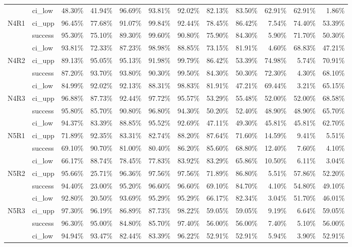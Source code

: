 \begin{tabular}{llrrrrrrrrrr}
     & ci\_low &      48.30\% & 41.94\% & 96.69\% & 93.81\% & 92.02\% &       82.13\% & 83.50\% & 62.91\% & 62.91\% &  1.86\% \\
N4R1 & ci\_upp &      96.45\% & 77.68\% & 91.07\% & 99.84\% & 92.44\% &       78.45\% & 86.42\% &  7.54\% & 74.40\% & 53.39\% \\
     & success &      95.30\% & 75.10\% & 89.30\% & 99.60\% & 90.80\% &       75.90\% & 84.30\% &  5.90\% & 71.70\% & 50.30\% \\
     & ci\_low &      93.81\% & 72.33\% & 87.23\% & 98.98\% & 88.85\% &       73.15\% & 81.91\% &  4.60\% & 68.83\% & 47.21\% \\
N4R2 & ci\_upp &      89.13\% & 95.05\% & 95.13\% & 91.98\% & 99.79\% &       86.42\% & 53.39\% & 74.98\% &  5.74\% & 70.91\% \\
     & success &      87.20\% & 93.70\% & 93.80\% & 90.30\% & 99.50\% &       84.30\% & 50.30\% & 72.30\% &  4.30\% & 68.10\% \\
     & ci\_low &      84.99\% & 92.02\% & 92.13\% & 88.31\% & 98.83\% &       81.91\% & 47.21\% & 69.44\% &  3.21\% & 65.15\% \\
N4R3 & ci\_upp &      96.88\% & 87.73\% & 92.44\% & 97.72\% & 95.57\% &       53.29\% & 55.48\% & 52.00\% & 52.00\% & 68.58\% \\
     & success &      95.80\% & 85.70\% & 90.80\% & 96.80\% & 94.30\% &       50.20\% & 52.40\% & 48.90\% & 48.90\% & 65.70\% \\
     & ci\_low &      94.37\% & 83.39\% & 88.85\% & 95.52\% & 92.69\% &       47.11\% & 49.30\% & 45.81\% & 45.81\% & 62.70\% \\
N5R1 & ci\_upp &      71.89\% & 92.35\% & 83.31\% & 82.74\% & 88.20\% &       87.64\% & 71.60\% & 14.59\% &  9.41\% &  5.51\% \\
     & success &      69.10\% & 90.70\% & 81.00\% & 80.40\% & 86.20\% &       85.60\% & 68.80\% & 12.40\% &  7.60\% &  4.10\% \\
     & ci\_low &      66.17\% & 88.74\% & 78.45\% & 77.83\% & 83.92\% &       83.29\% & 65.86\% & 10.50\% &  6.11\% &  3.04\% \\
N5R2 & ci\_upp &      95.66\% & 25.71\% & 96.36\% & 97.56\% & 97.56\% &       71.89\% & 86.80\% &  5.51\% & 57.86\% & 52.20\% \\
     & success &      94.40\% & 23.00\% & 95.20\% & 96.60\% & 96.60\% &       69.10\% & 84.70\% &  4.10\% & 54.80\% & 49.10\% \\
     & ci\_low &      92.80\% & 20.50\% & 93.69\% & 95.29\% & 95.29\% &       66.17\% & 82.34\% &  3.04\% & 51.70\% & 46.01\% \\
N5R3 & ci\_upp &      97.30\% & 96.19\% & 86.89\% & 87.73\% & 98.22\% &       59.05\% & 59.05\% &  9.19\% &  6.64\% & 59.05\% \\
     & success &      96.30\% & 95.00\% & 84.80\% & 85.70\% & 97.40\% &       56.00\% & 56.00\% &  7.40\% &  5.10\% & 56.00\% \\
     & ci\_low &      94.94\% & 93.47\% & 82.44\% & 83.39\% & 96.22\% &       52.91\% & 52.91\% &  5.94\% &  3.90\% & 52.91\% \\
\bottomrule
\end{tabular}


